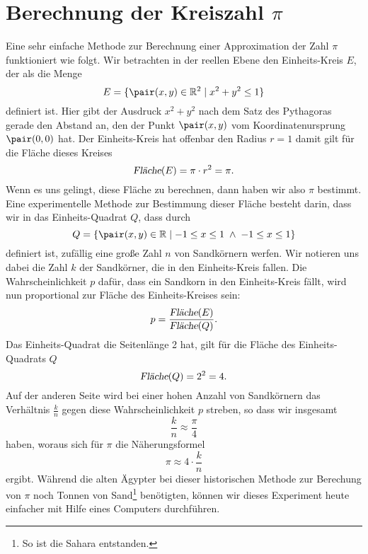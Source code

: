 \section{Berechnung der Kreiszahl $\pi$}
Eine sehr einfache Methode zur Berechnung einer Approximation der Zahl $\pi$ funktioniert wie folgt.
Wir betrachten in der reellen Ebene den Einheits-Kreis $E$, der als die Menge
\[ E = \{ \pair(x,y) \in \mathbb{R}^2 \mid x^2 + y^2 \leq 1 \} \]
definiert ist.  Hier gibt der Ausdruck $x^2 + y^2$ nach dem Satz des Pythagoras gerade den Abstand an,
den der Punkt $\pair(x,y)$ vom Koordinatenursprung $\pair(0,0)$ hat.  Der Einheits-Kreis hat offenbar den
Radius $r = 1$ damit gilt f\"ur die Fl\"ache dieses Kreises
\[ \textsl{Fl\"ache}(E) = \pi \cdot r^2 = \pi. \]
Wenn es uns gelingt, diese Fl\"ache zu berechnen, dann haben wir also $\pi$ bestimmt.  Eine experimentelle
Methode zur Bestimmung dieser Fl\"ache besteht darin, dass wir in das Einheits-Quadrat $Q$, dass durch
\[ Q = \{ \pair(x,y) \in \mathbb{R} \mid -1 \leq x \leq 1 \;\wedge\; -1 \leq x \leq 1 \} \]
definiert ist, zuf\"allig eine gro{\ss}e Zahl $n$ von Sandk\"ornern werfen.  Wir notieren uns dabei die Zahl $k$ 
der Sandk\"orner, die in den Einheits-Kreis fallen.  Die Wahrscheinlichkeit $p$ daf\"ur, dass ein Sandkorn in den
Einheits-Kreis f\"allt, wird nun proportional zur Fl\"ache des Einheits-Kreises sein:
\[ p = \frac{\textsl{Fl\"ache}(E)}{\textsl{Fl\"ache}(Q)}. \]
Das Einheits-Quadrat die Seitenl\"ange 2 hat, gilt f\"ur die Fl\"ache des Einheits-Quadrats $Q$ 
\[ \textsl{Fl\"ache}(Q) = 2^2 = 4. \]
Auf der anderen Seite wird bei einer hohen Anzahl von Sandk\"ornern das Verh\"altnis $\frac{k}{n}$ gegen diese
Wahrscheinlichkeit $p$ streben, so dass wir insgesamt
\[ \frac{k}{n} \approx \frac{\pi}{4} \]
haben, woraus sich f\"ur $\pi$ die N\"aherungsformel
\[ \pi \approx 4 \cdot \frac{k}{n} \]
ergibt.  W\"ahrend die alten \"Agypter bei dieser historischen Methode zur Berechung von $\pi$ noch Tonnen von
Sand\footnote{So ist die Sahara entstanden.}
ben\"otigten,  k\"onnen wir dieses Experiment heute einfacher mit Hilfe eines Computers durchf\"uhren.

